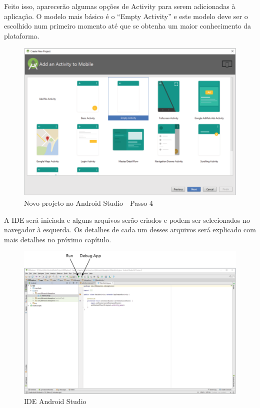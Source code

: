 Feito isso, aparecerão algumas opções de Activity para serem adicionadas à 
aplicação. O modelo mais básico é o \enquote{Empty Activity} e este modelo deve
ser o escolhido num primeiro momento até que se obtenha um maior conhecimento
da plataforma.

\begin{figure}[H]
    \centering
    \includegraphics[scale=0.65]{images/android_studio_4}
    \caption[Novo projeto no Android Studio - Passo 4]
    {Novo projeto no Android Studio - Passo 4 \cite{DiMarzio2016}}
    \label{fig:android_studio_4}
\end{figure}

A IDE será iniciada e alguns arquivos serão criados e podem ser selecionados
no navegador à esquerda. Os detalhes de cada um 
desses arquivos será explicado com mais detalhes no próximo capítulo.

\begin{figure}[H]
    \centering
    \includegraphics[width=\textwidth]{images/android_studio_5}
    \caption[IDE Android Studio]
    {IDE Android Studio \cite{DiMarzio2016}}
    \label{fig:android_studio_5}
\end{figure}

